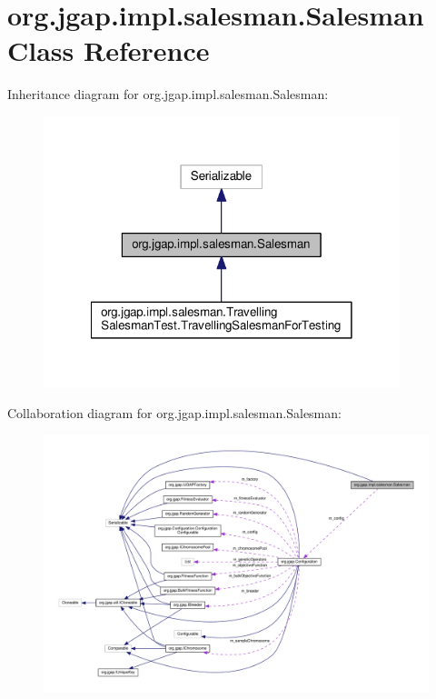 \hypertarget{classorg_1_1jgap_1_1impl_1_1salesman_1_1_salesman}{\section{org.\-jgap.\-impl.\-salesman.\-Salesman Class Reference}
\label{classorg_1_1jgap_1_1impl_1_1salesman_1_1_salesman}
}


Inheritance diagram for org.\-jgap.\-impl.\-salesman.\-Salesman\-:
\nopagebreak
\begin{figure}[H]
\begin{center}
\leavevmode
\includegraphics[width=294pt]{classorg_1_1jgap_1_1impl_1_1salesman_1_1_salesman__inherit__graph}
\end{center}
\end{figure}


Collaboration diagram for org.\-jgap.\-impl.\-salesman.\-Salesman\-:
\nopagebreak
\begin{figure}[H]
\begin{center}
\leavevmode
\includegraphics[width=350pt]{classorg_1_1jgap_1_1impl_1_1salesman_1_1_salesman__coll__graph}
\end{center}
\end{figure}
